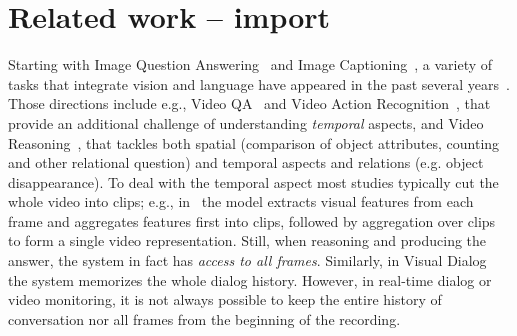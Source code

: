 




\section{Related work -- import}


Starting with Image Question Answering~\cite{malinowski2014multi,antol2015} and Image Captioning~\cite{karpathy2015deep}, a variety of tasks that integrate vision and language have appeared in the past several years~\cite{mogadala2019trends}. 
Those directions include e.g., Video QA~\cite{MovieQA} and Video Action Recognition~\cite{monfort2019moments}, that provide an additional challenge of understanding \emph{temporal} aspects, and Video Reasoning~\cite{song2018explore,yang2018dataset}, that tackles both spatial (comparison of object attributes, counting and other relational question) and temporal aspects and relations (e.g. object disappearance).
To deal with the temporal aspect most studies typically cut the whole video into clips; e.g., in~\cite{song2018explore} the model extracts visual features from each frame and aggregates features first into clips, followed by aggregation over clips to form a single video representation.
Still, when reasoning and producing the answer, the system in fact has \textit{access to all frames}. 
Similarly, in Visual Dialog~\cite{das2017visual} the system memorizes the whole dialog history.
However, in real-time dialog or video monitoring, it is not always possible to keep the entire history of conversation nor all frames from the beginning of the recording.  


